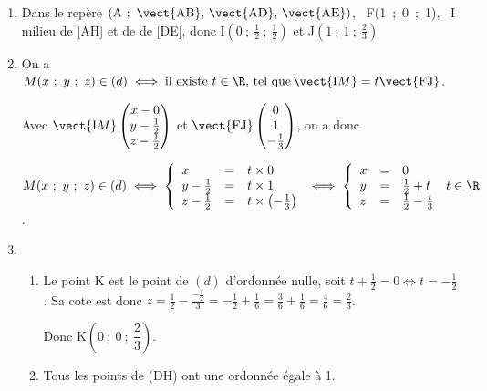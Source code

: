 \begin{enumerate}
\item %
Dans le repère $\left(\text{A}~;~\vect{\text{AB}},\,\vect{\text{AD}},\, \vect{\text{AE}}\right)$, \, F(1~;~0~;~1), \, I milieu de [AH] et de de [DE], donc I$\left(0~;~\frac{1}{2}~;~\frac{1}{2}\right)$ et J$\left(1~;~1~;~\frac{2}{3}\right)$

\item %
On a $M(x~;~y~;~z) \in (d) \iff \text{il existe } t \in \R,\, \text{tel que}\, \vect{\text{I}M} = t\vect{\text{FJ}}$.

Avec $\vect{\text{I}M}\begin{pmatrix}x - 0\\y - \frac{1}{2}\\z - \frac{1}{2}\end{pmatrix}$ et 
$\vect{\text{FJ}}\begin{pmatrix}0\\1\\-\frac{1}{3}\end{pmatrix}$, on a donc 

$M(x~;~y~;~z) \in (d) \iff \left\{\begin{array}{l c l}
x&=&t \times 0\\
y - \frac{1}{2}&=&t \times 1\\
z - \frac{1}{2}&=&t \times \left( -\frac{1}{3}\right)
\end{array}\right. \iff \left\{\begin{array}{l c l}
x&=&0\\
y &=&\frac{1}{2} + t \\
z &=&\frac{1}{2} -\frac{t}{3}
\end{array}\right.\, t \in \R$.
\item 
	\begin{enumerate}
		\item %
Le point K est le point de $(d)$ d'ordonnée nulle, soit $t + \frac{1}{2} = 0 \iff t = - \frac{1}{2}$. Sa cote est donc $z = \frac{1}{2} - \frac{- \frac{1}{2}}{3} = - \frac{1}{2} + \frac{1}{6} = \frac{3}{6} + \frac{1}{6} = \frac{4}{6} = \frac{2}{3}$.
		
Donc K$\left(0~;~ 0~;~\dfrac{2}{3}\right)$.
		\item %
		Tous les points de (DH) ont une ordonnée égale à 1.


\end{enumerate}
\end{enumerate}
